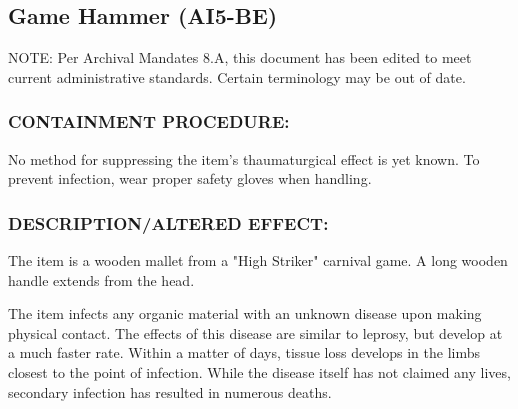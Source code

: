 \subsection*{Game Hammer (AI5-BE)}
\par NOTE: Per Archival Mandates 8.A, this
document has been edited to meet
current administrative standards. Certain
terminology may be out of date.
\subsubsection*{CONTAINMENT PROCEDURE:}
\par No method for suppressing the item's
thaumaturgical effect is yet known. To
prevent infection, wear proper safety
gloves when handling.
\subsubsection*{DESCRIPTION/ALTERED EFFECT:}
\par The item is a wooden mallet from a "High Striker" carnival game.
A long wooden handle extends from the head.
\par The item infects any organic material with an unknown disease
upon making physical contact. The effects of this disease are
similar to leprosy, but develop at a much faster rate. Within a
matter of days, tissue loss develops in the limbs closest to the
point of infection. While the disease itself has not claimed any
lives, secondary infection has resulted in numerous deaths.
